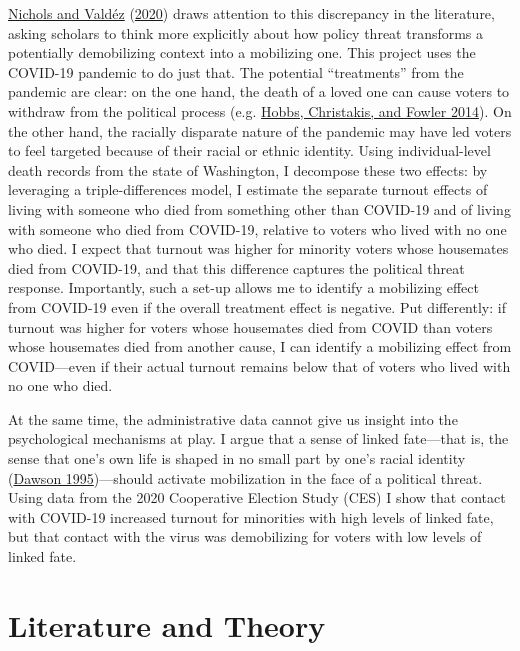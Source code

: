 \documentclass[
  12pt,
]{article}
\begin{document}
\protect\hyperlink{ref-Nichols2020a}{Nichols and Valdéz} (\protect\hyperlink{ref-Nichols2020a}{2020}) draws attention to this discrepancy in the literature, asking scholars to think more explicitly about how policy threat transforms a potentially demobilizing context into a mobilizing one. This project uses the COVID-19 pandemic to do just that. The potential ``treatments'' from the pandemic are clear: on the one hand, the death of a loved one can cause voters to withdraw from the political process (e.g. \protect\hyperlink{ref-Hobbs2014}{Hobbs, Christakis, and Fowler 2014}). On the other hand, the racially disparate nature of the pandemic may have led voters to feel targeted because of their racial or ethnic identity. Using individual-level death records from the state of Washington, I decompose these two effects: by leveraging a triple-differences model, I estimate the separate turnout effects of living with someone who died
from something other than COVID-19 and of living with someone who died from COVID-19, relative to voters who lived with no one who died. I expect that turnout was higher for minority voters whose housemates died from COVID-19, and that this difference captures the political threat response. Importantly, such a set-up allows me to identify a mobilizing effect from COVID-19 even if the overall treatment effect is negative. Put differently: if turnout was higher for voters whose housemates died from COVID than voters whose housemates died from another cause, I can identify a mobilizing effect from COVID---even if their actual turnout remains below that of voters who lived with no one who died.

At the same time, the administrative data cannot give us insight into the psychological mechanisms at play. I argue that a sense of linked fate---that is, the sense that one's own life is shaped in no small part by one's racial identity (\protect\hyperlink{ref-Dawson1995}{Dawson 1995})---should activate mobilization in the face of a political threat. Using data from the 2020 Cooperative Election Study (CES) I show that contact with COVID-19 increased turnout for minorities with high levels of linked fate, but that contact with the virus was demobilizing for voters with low levels of linked fate.

\hypertarget{literature-and-theory}{%
\section*{Literature and Theory}\label{literature-and-theory}}
\end{document}
